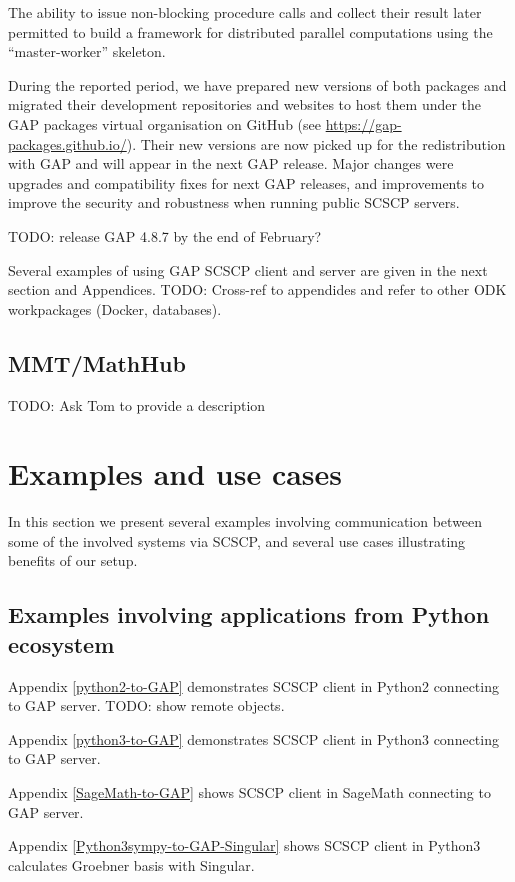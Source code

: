 \documentclass{deliverablereport}
\begin{document}
The ability to issue non-blocking procedure calls and collect their result
later permitted to build a framework for distributed parallel computations
using the ``master-worker'' skeleton.

During the reported period, we have prepared new versions of 
both packages and migrated their development repositories and
websites to host them under the GAP packages virtual organisation 
on GitHub (see \url{https://gap-packages.github.io/}).
Their new versions are now picked up for the redistribution
with GAP and will appear in the next GAP release. Major changes
were upgrades and compatibility fixes for next GAP releases, 
and improvements to improve the security and robustness when
running public SCSCP servers. 

TODO: release GAP 4.8.7 by the end of February?

Several examples of using GAP SCSCP client and server are given
in the next section and Appendices. TODO: Cross-ref to appendides
and refer to other ODK workpackages (Docker, databases).


\subsection{MMT/MathHub}

TODO: Ask Tom to provide a description


\section{Examples and use cases}\label{examples}

In this section we present several examples 
involving communication between some of the
involved systems via SCSCP, and several use
cases illustrating benefits of our setup.

\subsection{Examples involving applications from Python ecosystem}

Appendix \ref{python2-to-GAP} demonstrates SCSCP client in Python2 connecting to GAP server.
TODO: show remote objects.

Appendix \ref{python3-to-GAP} demonstrates SCSCP client in Python3 connecting to GAP server.

Appendix \ref{SageMath-to-GAP} shows SCSCP client in SageMath connecting to GAP server.

Appendix \ref{Python3sympy-to-GAP-Singular} shows SCSCP client in Python3 calculates Groebner basis with Singular.
\end{document}
